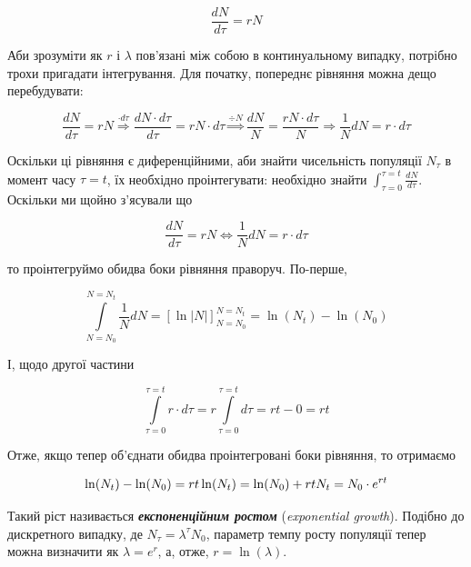 \documentclass[
  11pt,
]{book}
\begin{document}
\[\frac{dN}{d\tau} = rN\]

Аби зрозуміти як \(r\) і \(\lambda\) пов'язані між собою в континуальному випадку, потрібно трохи пригадати інтегрування. Для початку, попереднє рівняння можна дещо перебудувати:

\[\frac{dN}{d\tau} = rN \stackrel{\cdot d\tau}{\Rightarrow} \frac{dN \cdot d\tau}{d\tau} = rN \cdot d\tau \stackrel{\div N}{\Rightarrow} \frac{dN}{N} = \frac{rN \cdot d\tau}{N} \Rightarrow \frac{1}{N}dN = r \cdot d\tau\]

Оскільки ці рівняння є диференційними, аби знайти чисельність популяції \(N_\tau\) в момент часу \(\tau = t\), їх необхідно проінтегувати: необхідно знайти \(\int_{\tau=0}^{\tau=t} \frac{dN}{d\tau}\). Оскільки ми щойно з'ясували що

\[\frac{dN}{d\tau} = rN \Leftrightarrow \frac{1}{N}dN = r \cdot d\tau\]

то проінтегруймо обидва боки рівняння праворуч. По-перше,

\[\int\limits_{N = N_0}^{N = N_t} \frac{1}{N}dN = \left[ \ln |N| \right]_{N = N_0}^{N=N_t} = \ln(N_t) - \ln(N_0)\]

І, щодо другої частини

\[\int \limits_{\tau=0}^{\tau = t} r \cdot d\tau = r \int \limits_{\tau=0}^{\tau = t} d\tau = rt - 0 = rt\]

Отже, якщо тепер об'єднати обидва проінтегровані боки рівняння, то отримаємо

\[
\ln(N_t) - \ln(N_0) = rt \\
\ln(N_t) = \ln(N_0) + rt \\
N_t = N_0 \cdot e^{rt}
\]

Такий ріст називається \textbf{\emph{експоненційним ростом}} (\emph{exponential growth}). Подібно до дискретного випадку, де \(N_\tau = \lambda^\tau N_0\), параметр темпу росту популяції тепер можна визначити як \(\lambda = e^r\), а, отже, \(r = \ln(\lambda)\).
\end{document}
